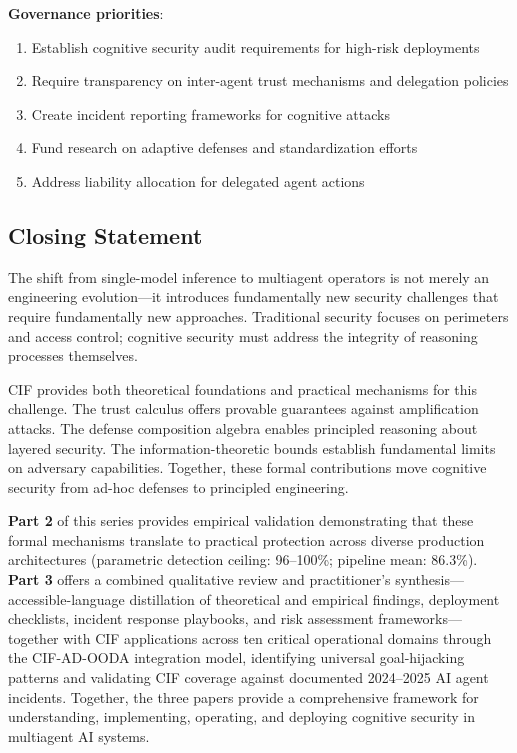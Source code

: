 \documentclass[
]{article}
\begin{document}
\textbf{Governance priorities}:

\begin{enumerate}
\item Establish cognitive security audit requirements for high-risk deployments
\item Require transparency on inter-agent trust mechanisms and delegation policies
\item Create incident reporting frameworks for cognitive attacks
\item Fund research on adaptive defenses and standardization efforts
\item Address liability allocation for delegated agent actions
\end{enumerate}

\subsection{Closing Statement}\label{sec:closing}

The shift from single-model inference to multiagent operators is not
merely an engineering evolution---it introduces fundamentally new
security challenges that require fundamentally new approaches.
Traditional security focuses on perimeters and access control; cognitive
security must address the integrity of reasoning processes themselves.

CIF provides both theoretical foundations and practical mechanisms for
this challenge. The trust calculus offers provable guarantees against
amplification attacks. The defense composition algebra enables
principled reasoning about layered security. The information-theoretic
bounds establish fundamental limits on adversary capabilities. Together,
these formal contributions move cognitive security from ad-hoc defenses
to principled engineering.

\textbf{Part 2} of this series provides empirical validation
demonstrating that these formal mechanisms translate to practical
protection across diverse production architectures (parametric detection
ceiling: 96--100\%; pipeline mean: 86.3\%). \textbf{Part 3} offers a
combined qualitative review and practitioner's
synthesis---accessible-language distillation of theoretical and
empirical findings, deployment checklists, incident response playbooks,
and risk assessment frameworks---together with CIF applications across
ten critical operational domains through the CIF-AD-OODA integration
model, identifying universal goal-hijacking patterns and validating CIF
coverage against documented 2024--2025 AI agent incidents. Together, the
three papers provide a comprehensive framework for understanding,
implementing, operating, and deploying cognitive security in multiagent
AI systems.
\end{document}
